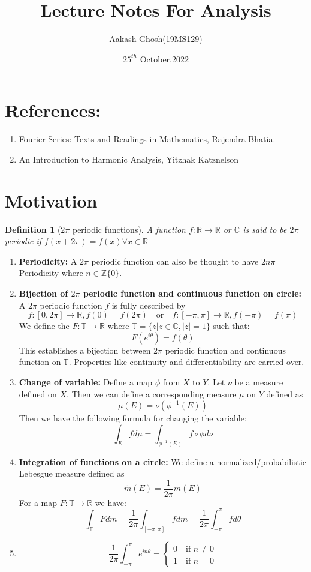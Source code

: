 \documentclass{article}
\title{Lecture Notes For Analysis}
\date{$25^{th}$ October,2022}
\author{Aakash Ghosh(19MS129)}
\newtheorem{definition}{Definition}[]
\begin{document}
\maketitle

\section*{References:}
\begin{enumerate}
	\item Fourier Series: Texts and Readings in Mathematics, Rajendra Bhatia.
	\item An Introduction to Harmonic Analysis, Yitzhak Katznelson
\end{enumerate}
\section{Motivation}
\begin{definition}[$2\pi$ periodic functions]
	A function $f:\mathbb{R}\to\mathbb{R}$ or $\mathbb{C}$ is said to be $2\pi$ periodic if $f(x+2\pi)=f(x)\forall x\in\mathbb R$
\end{definition}
\begin{enumerate}
	\item \textbf{Periodicity: }A $2\pi$ periodic function can also be thought to have $2n\pi$ Periodicity where $n\in\mathbb{Z}\{0\}$. 
	\item \textbf{Bijection of $2\pi$ periodic function and continuous function on circle:} A $2\pi$ periodic function $f$ is fully described by 
	$$f:[0,2\pi]\to\mathbb{R},f(0)=f(2\pi)\quad\text{or}\quad f:[-\pi,\pi]\to\mathbb{R},f(-\pi)=f(\pi)$$
	We define the $F:\mathbb{T}\to\mathbb{R}$ where $\mathbb{T}=\{z|z\in\mathbb C,|z|=1\}$ such that:
	$$F(e^{i\theta})=f(\theta)$$
	This establishes a bijection between $2\pi$ periodic function and continuous function on $\mathbb T$. Properties like continuity and differentiability are carried over. 
	\item \textbf{Change of variable: }
	Define a map $\phi$ from $X$ to $Y$. Let $\nu$ be a measure defined on $X$. Then we can define a corresponding measure $\mu$ on $Y$ defined as 
	$$\mu(E)=\nu(\phi^{-1}(E))$$
	Then we have the following formula for changing the variable:
	$$\int_Efd\mu=\int_{\phi^{-1}(E)}f\circ\phi d\nu$$
	\item \textbf{Integration of functions on a circle: }We define a normalized/probabilistic Lebesgue measure defined as
	$$\tilde m(E)=\frac{1}{2\pi}m(E)$$ 
	For a map $F:\mathbb T\to\mathbb R$ we have:
	$$\int_\mathbb TFd\tilde m=\frac{1}{2\pi}\int_{[-\pi,\pi]}fdm=\frac{1}{2\pi}\int_{-\pi}^\pi fd\theta$$
	\item $$\frac{1}{2\pi}\int_{-\pi}^\pi e^{in\theta}=\begin{cases}
		0\quad\text{if }n\ne0\\
		1\quad\text{if }n=0
	\end{cases}$$
\end{enumerate}
\end{document}
